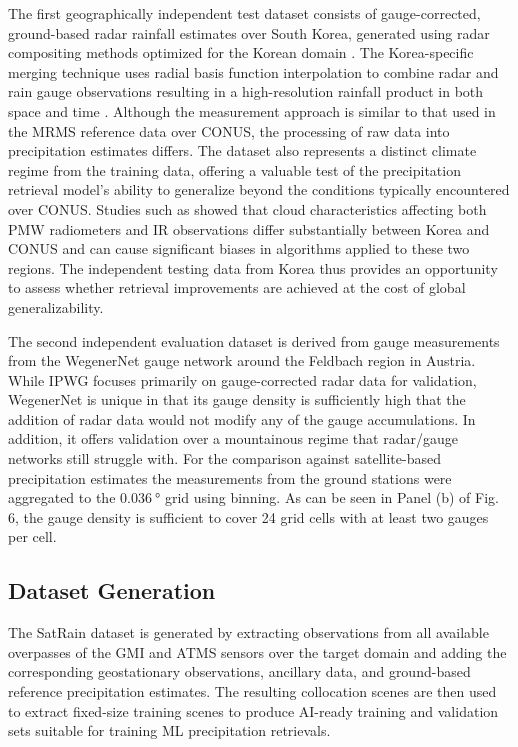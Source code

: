 \documentclass[11pt]{article}
\begin{document}
The first geographically independent test dataset consists of gauge-corrected,
ground-based radar rainfall estimates over South Korea, generated using radar
compositing methods optimized for the Korean domain
\citep{Kwon2015RadarComparison}. The Korea-specific merging technique uses
radial basis function interpolation to combine radar and rain gauge observations
resulting in a high-resolution rainfall product in both space and time
\citep{Ryu2025RBFMerging}. Although the measurement approach is similar to that
used in the MRMS reference data over CONUS, the processing of raw data into
precipitation estimates differs. The dataset also represents a distinct climate
regime from the training data, offering a valuable test of the precipitation
retrieval model’s ability to generalize beyond the conditions typically
encountered over CONUS. Studies such as \cite{Sohn2013WarmRain} showed that
cloud characteristics affecting both PMW radiometers and IR observations differ
substantially between Korea and CONUS and can cause significant biases in
algorithms applied to these two regions. The independent testing data from Korea
thus provides an opportunity to assess whether retrieval improvements are
achieved at the cost of global generalizability.

The second independent evaluation dataset is derived from gauge measurements
from the WegenerNet \citep{Fuchsberger2021WegenerNet} gauge network around the
Feldbach region in Austria. While IPWG focuses primarily on gauge-corrected
radar data for validation, WegenerNet is unique in that its gauge density is
sufficiently high that the addition of radar data would not modify any of the
gauge accumulations. In addition, it offers validation over a mountainous regime
that radar/gauge networks still struggle with. For the comparison against
satellite-based precipitation estimates the measurements from the ground
stations were aggregated to the $\SI{0.036}{\degree}$ grid using binning. As can
be seen in Panel (b) of Fig. 6, the gauge density is sufficient to cover 24 grid
cells with at least two gauges per cell.


\subsection{Dataset Generation}

The SatRain dataset is generated by extracting observations from all available
overpasses of the GMI and ATMS sensors over the target domain and adding the
corresponding geostationary observations, ancillary data, and ground-based
reference precipitation estimates. The resulting collocation scenes are then
used to extract fixed-size training scenes to produce AI-ready training and
validation sets suitable for training ML precipitation retrievals.
\end{document}
